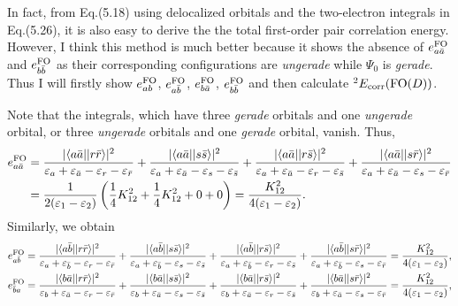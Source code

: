\documentclass[a4paper]{book}
\newcounter{solution}[chapter]
\newcommand{\corr}{{\rm corr}}
\newcommand{\FO}{{\rm FO}}
\begin{document}
	\begin{solution}
	In fact, from Eq.(5.18) using delocalized orbitals and the two-electron integrals in Eq.(5.26), it is also easy to derive the the total first-order pair correlation energy. However, I think this method is much better because it shows the absence of $e^\FO_{a\bar{a}}$ and $e^\FO_{b\bar{b}}$ as their corresponding configurations are {\it ungerade} while $\Psi_0$ is {\it gerade}. Thus I will firstly show $e^\FO_{ab}$, $e^\FO_{a\bar{b}}$, $e^\FO_{b\bar{a}}$, $e^\FO_{b\bar{b}}$ and then calculate $^2 E_\corr( {\rm FO}(D) )$. 
	
	Note that the integrals, which have three {\it gerade} orbitals and one {\it ungerade} orbital, or three {\it ungerade} orbitals and one {\it gerade} orbital, vanish. Thus,
	\begin{align*}
		e^\FO_{a\bar{a}} &= \frac{ | \langle a \bar{a} || r \bar{r} \rangle |^2 }{ \varepsilon_a + \varepsilon_{\bar{a}} - \varepsilon_r - \varepsilon_{\bar{r}} }	+ \frac{ | \langle a \bar{a} || s \bar{s} \rangle |^2 }{ \varepsilon_a + \varepsilon_{\bar{a}} - \varepsilon_s - \varepsilon_{\bar{s}} } + \frac{ | \langle a \bar{a} || r \bar{s} \rangle |^2 }{ \varepsilon_a + \varepsilon_{\bar{a}} - \varepsilon_r - \varepsilon_{\bar{s}} } + \frac{ | \langle a \bar{a} || s \bar{r} \rangle |^2 }{ \varepsilon_a + \varepsilon_{\bar{a}} - \varepsilon_s - \varepsilon_{\bar{r}} } \\
		&= \frac{1}{2(\varepsilon_1 - \varepsilon_2)} \left( \frac{1}{4} K^2_{12} + \frac{1}{4} K^2_{12} + 0 + 0 \right) = \frac{ K^2_{12} }{ 4(\varepsilon_1 - \varepsilon_2) }. 
	\end{align*}
	Similarly, we obtain
	\begin{align*}
		e^\FO_{a\bar{b}} &= \frac{ | \langle a \bar{b} || r \bar{r} \rangle |^2 }{ \varepsilon_a + \varepsilon_{\bar{b}} - \varepsilon_r - \varepsilon_{\bar{r}} }	+ \frac{ | \langle a \bar{b} || s \bar{s} \rangle |^2 }{ \varepsilon_a + \varepsilon_{\bar{b}} - \varepsilon_s - \varepsilon_{\bar{s}} } + \frac{ | \langle a \bar{b} || r \bar{s} \rangle |^2 }{ \varepsilon_a + \varepsilon_{\bar{b}} - \varepsilon_r - \varepsilon_{\bar{s}} } + \frac{ | \langle a \bar{b} || s \bar{r} \rangle |^2 }{ \varepsilon_a + \varepsilon_{\bar{b}} - \varepsilon_s - \varepsilon_{\bar{r}} } = \frac{ K^2_{12} }{ 4(\varepsilon_1 - \varepsilon_2) } , \\
		e^\FO_{\bar{b}a} &= \frac{ | \langle b \bar{a} || r \bar{r} \rangle |^2 }{ \varepsilon_b + \varepsilon_{\bar{a}} - \varepsilon_r - \varepsilon_{\bar{r}} }	+ \frac{ | \langle b \bar{a} || s \bar{s} \rangle |^2 }{ \varepsilon_b + \varepsilon_{\bar{a}} - \varepsilon_s - \varepsilon_{\bar{s}} } + \frac{ | \langle b \bar{a} || r \bar{s} \rangle |^2 }{ \varepsilon_b + \varepsilon_{\bar{a}} - \varepsilon_r - \varepsilon_{\bar{s}} } + \frac{ | \langle b \bar{a} || s \bar{r} \rangle |^2 }{ \varepsilon_b + \varepsilon_{\bar{a}} - \varepsilon_s - \varepsilon_{\bar{r}} } = \frac{ K^2_{12} }{ 4(\varepsilon_1 - \varepsilon_2) } , \\

\end{align*}
\end{solution}
\end{document}
